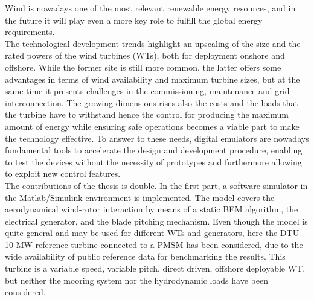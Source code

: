 Wind is nowadays one of the most relevant renewable energy resources, and in the future it will play even a more key role to fulfill the global energy requirements.\\
The technological development trends highlight an upscaling of the size and the rated powers of the wind turbines (WTs), both for deployment onshore and offshore. While the former site is still more common, the latter offers some advantages in terms of wind availability and maximum turbine sizes, but at the same time it presents challenges in the commissioning, maintenance and grid interconnection. The growing dimensions rises also the costs and the loads that the turbine have to withstand hence the control for producing the maximum amount of energy while ensuring safe operations becomes a viable part to make the technology effective. To answer to these needs, digital emulators are nowadays fundamental tools to accelerate the design and development procedure, enabling to test the devices without the necessity of prototypes and furthermore allowing to exploit new control features. \\
The contributions of the thesis is double. In the first part, a software simulator in the Matlab/Simulink environment is implemented. The model covers the aerodynamical wind-rotor interaction by means of a static BEM algorithm, the electrical generator, and the blade pitching mechanism. Even though the model is quite general and may be used for different WTs and generators, here the DTU 10 MW reference turbine connected to a PMSM has been considered, due to the wide availability of public reference data for benchmarking the results. This turbine is a variable speed, variable pitch, direct driven, offshore deployable WT, but neither the mooring system nor the hydrodynamic loads have been considered.\\
